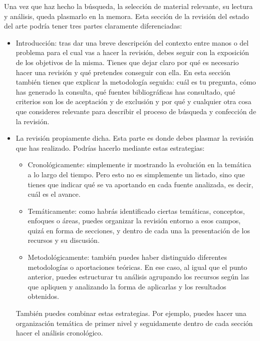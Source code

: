 Una vez que haz hecho la búsqueda, la selección de material relevante, su lectura y análisis, queda plasmarlo en la memora. Esta sección de la revisión del estado del arte podría tener tres partes claramente diferenciadas:

\begin{itemize}
    \item Introducción: tras dar una breve descripción del contexto entre manos o del problema para el cual vas a hacer la revisión, debes seguir con la exposición de los objetivos de la misma.  Tienes que dejar claro por qué es necesario hacer una revisión y qué pretendes conseguir con ella. En esta sección también tienes que explicar la metodología seguida: cuál es tu pregunta, cómo has generado la consulta, qué fuentes bibliográficas has consultado, qué criterios son los de aceptación y de exclusión y por qué y cualquier otra cosa que consideres relevante para describir el proceso de búsqueda y confección de la revisión.

    \item La revisión propiamente dicha. Esta parte es donde debes plasmar la revisión que has realizado. Podrías hacerlo mediante estas estrategias:

    \begin{itemize}
        \item Cronológicamente: simplemente ir mostrando la evolución en la temática a lo largo del tiempo. Pero esto no es simplemente un listado, sino que tienes que indicar qué se va aportando en cada fuente analizada, es decir, cuál es el avance.

        \item Temáticamente: como habrás identificado ciertas temáticas, conceptos, enfoques o áreas, puedes organizar la revisión entorno a esos campos, quizá en forma de secciones, y dentro de cada una la presentación de los recursos y su discusión.

        \item Metodológicamente: también puedes haber distinguido diferentes metodologías o aportaciones teóricas. En ese caso, al igual que el punto anterior, puedes estructurar tu análisis agrupando los recursos según las que apliquen y analizando la forma de aplicarlas y los resultados obtenidos.
    \end{itemize}
    
    También puedes combinar estas estrategias. Por ejemplo, puedes hacer una organización temática de primer nivel y seguidamente dentro de cada sección hacer el análisis cronológico.


\end{itemize}
